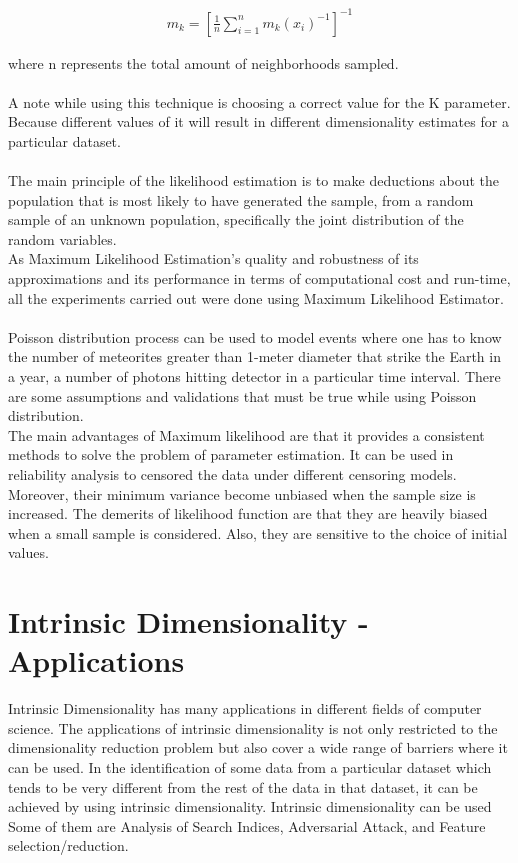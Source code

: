 \documentclass[12pt,letterpaper]{report}
\begin{document}
\begin{align}
    m_k = [\frac{1}{n} \sum_{i=1}^{n} m_k(x_i)^{-1}]^{-1}
\end{align}
 
 where n represents the total amount of neighborhoods sampled.\\\\
 
 A note while using this technique is choosing a correct value for the K parameter. Because different values of it will result in different dimensionality estimates for a particular dataset. \\\\
 
 The main principle of the likelihood estimation is to make deductions about the population that is most likely to have generated the sample, from a random sample of an unknown population, specifically the joint distribution of the random variables.
 \\
 As Maximum Likelihood Estimation's quality and robustness of its approximations and its performance in terms of computational cost and run-time, all the experiments carried out were done using Maximum Likelihood Estimator. \\\\

Poisson distribution process can be used to model events where one has to know the number of meteorites greater than 1-meter diameter that strike the Earth in a year, a number of photons hitting detector in a particular time interval\cite{5}. There are some assumptions and validations that must be true while using Poisson distribution.\\

The main advantages of Maximum likelihood are that it provides a consistent methods to solve the problem of parameter estimation. It can be used in reliability analysis to censored the data under different censoring models. Moreover, their minimum variance become unbiased when the sample size is increased. The demerits of likelihood function are that they are heavily biased when a small sample is considered. Also, they are sensitive to the choice of initial values\cite{6}.

\section{Intrinsic Dimensionality - Applications}
Intrinsic Dimensionality has many applications in different fields of computer science. The applications of intrinsic dimensionality is not only restricted to the dimensionality reduction problem but also cover a wide range of barriers where it can be used. In the identification of some data from a particular dataset which tends to be very different from the rest of the data in that dataset, it can be achieved by using intrinsic dimensionality. Intrinsic dimensionality can be used Some of them are Analysis of Search Indices, Adversarial Attack, and Feature selection/reduction. \\
\end{document}
